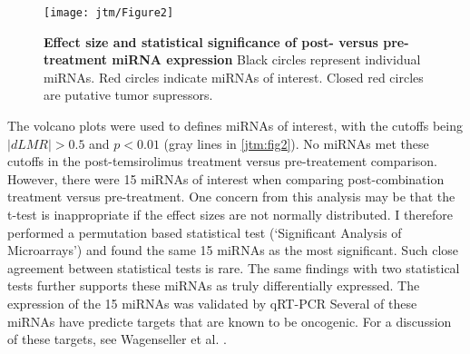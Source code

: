 \begin{figure}[h!]
  \centering
  \texttt{[image: jtm/Figure2]}
  \caption[Effect size and statistical significance of post- versus pre-treatment miRNA expression]{
       \textbf{Effect size and statistical significance of post- versus pre-treatment miRNA expression}
       Black circles represent individual miRNAs. Red circles indicate miRNAs of interest. Closed red
       circles are putative tumor supressors.
  }
  \label{jtm:fig2}
\end{figure}

The volcano plots were used to defines miRNAs of interest, with the cutoffs
being $|dLMR|>0.5$ and $p<0.01$ (gray lines in \autoref{jtm:fig2}). 
No miRNAs met these cutoffs in the
post-temsirolimus treatment versus pre-treatement comparison. However,
there were 15 miRNAs of interest when comparing post-combination treatment
versus pre-treatment. One concern from this analysis may be that the t-test
is inappropriate if the effect sizes are not normally distributed. I therefore
performed a permutation based statistical test (`Significant Analysis of Microarrays')
and found the same 15 miRNAs as the most significant. Such close agreement
between statistical tests is rare. The same findings with two statistical tests
further supports these miRNAs as truly differentially expressed.
The expression of the 15 miRNAs was validated by qRT-PCR
Several of these miRNAs have predicte targets that are known
to be oncogenic. For a discussion of these targets, see Wagenseller
et al. \cite{Wagenseller:2013fj}.

